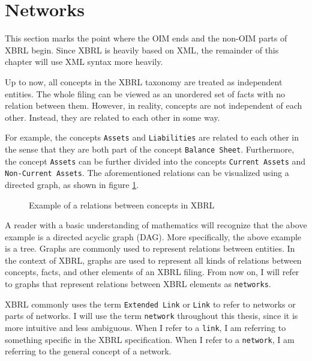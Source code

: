 \section{Networks}
\label{sec:xbrl_networks}

This section marks the point where the OIM ends and the non-OIM parts of XBRL begin.
Since XBRL is heavily based on XML, the remainder of this chapter will use XML syntax more heavily.

Up to now, all concepts in the XBRL taxonomy are treated as independent entities.
The whole filing can be viewed as an unordered set of facts with no relation between them.
However, in reality, concepts are not independent of each other.
Instead, they are related to each other in some way.


For example, the concepts \texttt{Assets} and \texttt{Liabilities} are related to each other in the sense that they are both part of the concept \texttt{Balance Sheet}.
Furthermore, the concept \texttt{Assets} can be further divided into the concepts \texttt{Current Assets} and \texttt{Non-Current Assets}.
The aforementioned relations can be visualized using a directed graph, as shown in figure \ref{fig:example_visualization_network_xbrl}.

\begin{figure}[H]
    \caption{Example of a relations between concepts in XBRL}
    \label{fig:example_visualization_network_xbrl}
\end{figure}

A reader with a basic understanding of mathematics will recognize that the above example is a directed acyclic graph (DAG).
More specifically, the above example is a tree.
Graphs are commonly used to represent relations between entities.
In the context of XBRL, graphs are used to represent all kinds of relations between concepts, facts, and other elements of an XBRL filing.
From now on, I will refer to graphs that represent relations between XBRL elements as \texttt{networks}.

XBRL commonly uses the term \texttt{Extended Link} or \texttt{Link} to refer to networks or parts of networks.
I will use the term \texttt{network} throughout this thesis, since it is more intuitive and less ambiguous.
When I refer to a \texttt{link}, I am referring to something specific in the XBRL specification.
When I refer to a \texttt{network}, I am referring to the general concept of a network.

